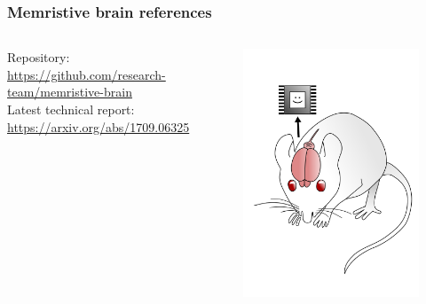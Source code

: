 \documentclass[12pt, aspectratio=169]{beamer}
\begin{document}
\begin{frame}
  \frametitle{Memristive brain references}
\begin{columns}[c]

Repository:\\
\url{https://github.com/research-team/memristive-brain}\\


Latest technical report:\\
\url{https://arxiv.org/abs/1709.06325}

\begin{figure}
\includegraphics[width=1.0\linewidth]{mousebrainpink}
\end{figure}
\end{columns}
\end{frame}
\end{document}
